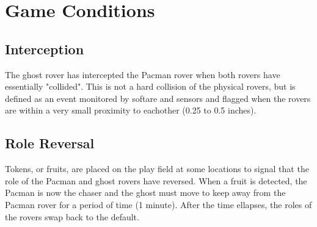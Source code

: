 \documentclass[12pt,letterpaper]{article}
\begin{document}
\section{Game Conditions}
\subsection{Interception}
The ghost rover has intercepted the Pacman rover when both rovers have essentially "collided". This is not a hard collision of the physical rovers, but is defined as an event monitored by softare and sensors and flagged when the rovers are within a very small proximity to eachother (0.25 to 0.5 inches). 

\subsection{Role Reversal}
Tokens, or fruits, are placed on the play field at some locations to signal that the role of the Pacman and ghost rovers have reversed. When a fruit is detected, the Pacman is now the chaser and the ghost must move to keep away from the Pacman rover for a period of time (1 minute). After the time ellapses, the roles of the rovers swap back to the default. 
\end{document}
